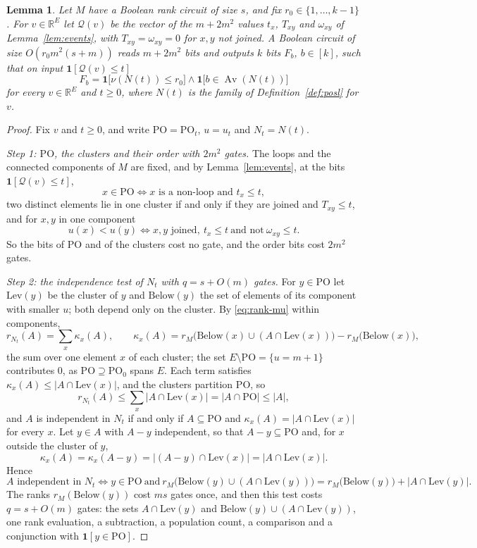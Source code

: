 \documentclass[11pt]{article}
\newtheorem{lemma}[theorem]{Lemma}
\newcommand{\R}{\mathbb R}
\newcommand{\PO}{\mathrm{PO}}
\newcommand{\Av}{\operatorname{Av}}
\begin{document}
\begin{lemma}
\label{lem:observer}
Let $M$ have a Boolean rank circuit of size $s$, and fix
$r_0\in\{1,\ldots,k-1\}$.  For
$v\in\R^{E}$ let $\mathcal Q(v)$ be the vector of the $m+2m^{2}$ values $t_x$,
$T_{xy}$ and $\omega_{xy}$ of Lemma~\ref{lem:events}, with $T_{xy}=\omega_{xy}=0$ for
$x,y$ not joined.  A Boolean circuit of size $O(r_0m^{2}(s+m))$ reads $m+2m^{2}$
bits and outputs $k$ bits $F_b$, $b\in[k]$, such that on input
$\mathbf 1[\mathcal Q(v)\le t]$
\[
  F_b=\mathbf 1\bigl[\nu(N(t))\le r_0\bigr]\wedge\mathbf 1\bigl[b\in\Av(N(t))\bigr]
\]
for every $v\in\R^{E}$ and $t\ge0$, where $N(t)$ is the family of
Definition~\ref{def:posl} for $v$.
\end{lemma}

\begin{proof}
Fix $v$ and $t\ge0$, and write $\PO=\PO_t$, $u=u_t$ and $N_t=N(t)$.

\emph{Step 1: $\PO$, the clusters and their order with $2m^{2}$ gates.}  The loops and the connected components of $M$ are
fixed, and by Lemma~\ref{lem:events}, at the bits $\mathbf 1[\mathcal Q(v)\le t]$,
\[
  x\in\PO\iff x\text{ is a non-loop and }t_x\le t,
\]
two distinct elements lie in one cluster if and only if they are joined and
$T_{xy}\le t$, and for $x,y$ in one component
\[
  u(x)<u(y)\iff x,y\text{ joined},\ t_x\le t\ \text{and not}\ \omega_{xy}\le t.
\]
So the bits of $\PO$ and of the clusters cost no gate, and the order bits cost
$2m^{2}$ gates.

\emph{Step 2: the independence test of $N_t$ with $q=s+O(m)$ gates.}  For $y\in\PO$ let $\mathrm{Lev}(y)$ be the cluster
of $y$ and $\mathrm{Below}(y)$ the set of elements of its component with smaller
$u$; both depend only on the cluster.  By \eqref{eq:rank-mu} within components,
\[
  r_{N_t}(A)=\sum_{x}\kappa_x(A),\qquad
  \kappa_x(A)=r_M\bigl(\mathrm{Below}(x)\cup(A\cap\mathrm{Lev}(x))\bigr)-r_M\bigl(\mathrm{Below}(x)\bigr),
\]
the sum over one element $x$ of each cluster; the set $E\setminus\PO=\{u=m+1\}$
contributes $0$, as $\PO\supseteq\PO_0$ spans $E$.  Each term satisfies
$\kappa_x(A)\le|A\cap\mathrm{Lev}(x)|$, and the clusters partition $\PO$, so
\[
  r_{N_t}(A)\le\sum_x|A\cap\mathrm{Lev}(x)|=|A\cap\PO|\le|A|,
\]
and $A$ is independent in $N_t$ if and only if $A\subseteq\PO$ and
$\kappa_x(A)=|A\cap\mathrm{Lev}(x)|$ for every $x$.  Let $y\in A$ with $A-y$
independent, so that $A-y\subseteq\PO$ and, for $x$ outside the cluster of $y$,
\[
  \kappa_x(A)=\kappa_x(A-y)=|(A-y)\cap\mathrm{Lev}(x)|=|A\cap\mathrm{Lev}(x)|.
\]
Hence
\[
  A\text{ independent in }N_t\iff y\in\PO\ \text{and}\
  r_M\bigl(\mathrm{Below}(y)\cup(A\cap\mathrm{Lev}(y))\bigr)
  =r_M\bigl(\mathrm{Below}(y)\bigr)+|A\cap\mathrm{Lev}(y)|.
\]
The ranks $r_M(\mathrm{Below}(y))$ cost $ms$ gates once, and then this test costs
$q=s+O(m)$ gates: the sets $A\cap\mathrm{Lev}(y)$ and
$\mathrm{Below}(y)\cup(A\cap\mathrm{Lev}(y))$, one rank evaluation, a subtraction,
a population count, a comparison and a conjunction with $\mathbf 1[y\in\PO]$.


\end{proof}
\end{document}
